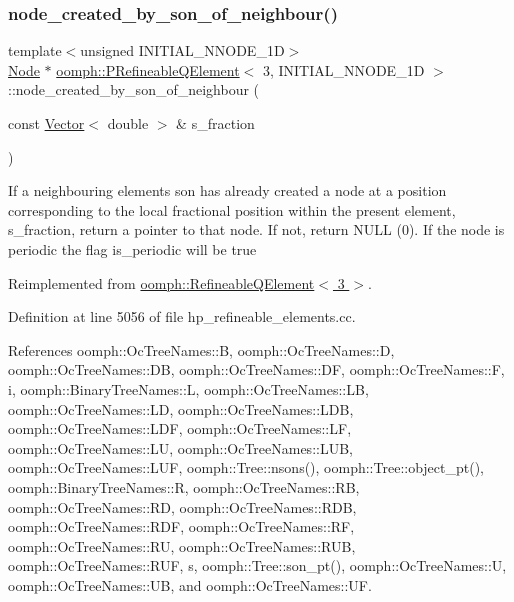 \subsubsection{\texorpdfstring{node\+\_\+created\+\_\+by\+\_\+son\+\_\+of\+\_\+neighbour()}{node\_created\_by\_son\_of\_neighbour()}}
{\footnotesize\ttfamily template$<$unsigned I\+N\+I\+T\+I\+A\+L\+\_\+\+N\+N\+O\+D\+E\+\_\+1D$>$ \\
\hyperlink{classoomph_1_1Node}{Node} $\ast$ \hyperlink{classoomph_1_1PRefineableQElement}{oomph\+::\+P\+Refineable\+Q\+Element}$<$ 3, I\+N\+I\+T\+I\+A\+L\+\_\+\+N\+N\+O\+D\+E\+\_\+1D $>$\+::node\+\_\+created\+\_\+by\+\_\+son\+\_\+of\+\_\+neighbour (\begin{DoxyParamCaption}\item[{const \hyperlink{classoomph_1_1Vector}{Vector}$<$ double $>$ \&}]{s\+\_\+fraction }\end{DoxyParamCaption})\hspace{0.3cm}{\ttfamily [virtual]}}

If a neighbouring element\textquotesingle{}s son has already created a node at a position corresponding to the local fractional position within the present element, s\+\_\+fraction, return a pointer to that node. If not, return N\+U\+LL (0). If the node is periodic the flag is\+\_\+periodic will be true 

Reimplemented from \hyperlink{classoomph_1_1RefineableQElement_3_013_01_4_aab54b116a277372d4af7d7c93301ecda}{oomph\+::\+Refineable\+Q\+Element$<$ 3 $>$}.



Definition at line 5056 of file hp\+\_\+refineable\+\_\+elements.\+cc.



References oomph\+::\+Oc\+Tree\+Names\+::B, oomph\+::\+Oc\+Tree\+Names\+::D, oomph\+::\+Oc\+Tree\+Names\+::\+DB, oomph\+::\+Oc\+Tree\+Names\+::\+DF, oomph\+::\+Oc\+Tree\+Names\+::F, i, oomph\+::\+Binary\+Tree\+Names\+::L, oomph\+::\+Oc\+Tree\+Names\+::\+LB, oomph\+::\+Oc\+Tree\+Names\+::\+LD, oomph\+::\+Oc\+Tree\+Names\+::\+L\+DB, oomph\+::\+Oc\+Tree\+Names\+::\+L\+DF, oomph\+::\+Oc\+Tree\+Names\+::\+LF, oomph\+::\+Oc\+Tree\+Names\+::\+LU, oomph\+::\+Oc\+Tree\+Names\+::\+L\+UB, oomph\+::\+Oc\+Tree\+Names\+::\+L\+UF, oomph\+::\+Tree\+::nsons(), oomph\+::\+Tree\+::object\+\_\+pt(), oomph\+::\+Binary\+Tree\+Names\+::R, oomph\+::\+Oc\+Tree\+Names\+::\+RB, oomph\+::\+Oc\+Tree\+Names\+::\+RD, oomph\+::\+Oc\+Tree\+Names\+::\+R\+DB, oomph\+::\+Oc\+Tree\+Names\+::\+R\+DF, oomph\+::\+Oc\+Tree\+Names\+::\+RF, oomph\+::\+Oc\+Tree\+Names\+::\+RU, oomph\+::\+Oc\+Tree\+Names\+::\+R\+UB, oomph\+::\+Oc\+Tree\+Names\+::\+R\+UF, s, oomph\+::\+Tree\+::son\+\_\+pt(), oomph\+::\+Oc\+Tree\+Names\+::U, oomph\+::\+Oc\+Tree\+Names\+::\+UB, and oomph\+::\+Oc\+Tree\+Names\+::\+UF.

